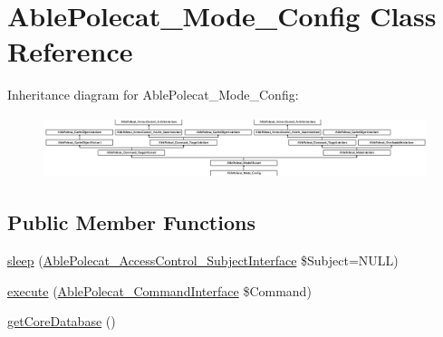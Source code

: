 \hypertarget{class_able_polecat___mode___config}{}\section{Able\+Polecat\+\_\+\+Mode\+\_\+\+Config Class Reference}
\label{class_able_polecat___mode___config}
Inheritance diagram for Able\+Polecat\+\_\+\+Mode\+\_\+\+Config\+:\begin{figure}[H]
\begin{center}
\leavevmode
\includegraphics[height=1.806452cm]{class_able_polecat___mode___config}
\end{center}
\end{figure}
\subsection*{Public Member Functions}
\begin{DoxyCompactItemize}
\item 
\hyperlink{class_able_polecat___mode___config_a365e24d7b066205cafa2a5cce3a4f224}{sleep} (\hyperlink{interface_able_polecat___access_control___subject_interface}{Able\+Polecat\+\_\+\+Access\+Control\+\_\+\+Subject\+Interface} \$Subject=N\+U\+L\+L)
\item 
\hyperlink{class_able_polecat___mode___config_aa7f01cbd17bffdbbb7511a3c37756064}{execute} (\hyperlink{interface_able_polecat___command_interface}{Able\+Polecat\+\_\+\+Command\+Interface} \$Command)
\item 
\hyperlink{class_able_polecat___mode___config_a9585fbac2aec4e691bf7c5b9031a0fd3}{get\+Core\+Database} ()
\end{DoxyCompactItemize}
